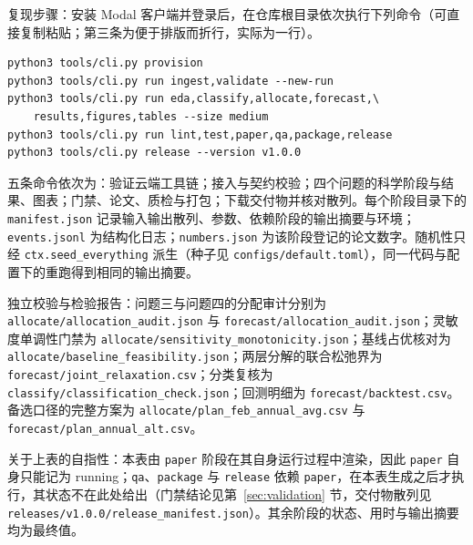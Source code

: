 复现步骤：安装 Modal 客户端并登录后，在仓库根目录依次执行下列命令（可直接复制粘贴；第三条为便于排版而折行，实际为一行）。

\begingroup\small
\begin{verbatim}
python3 tools/cli.py provision
python3 tools/cli.py run ingest,validate --new-run
python3 tools/cli.py run eda,classify,allocate,forecast,\
    results,figures,tables --size medium
python3 tools/cli.py run lint,test,paper,qa,package,release
python3 tools/cli.py release --version v1.0.0
\end{verbatim}
\endgroup

\noindent 五条命令依次为：验证云端工具链；接入与契约校验；四个问题的科学阶段与结果、图表；门禁、论文、质检与打包；下载交付物并核对散列。每个阶段目录下的 \nolinkurl{manifest.json} 记录输入输出散列、参数、依赖阶段的输出摘要与环境；\nolinkurl{events.jsonl} 为结构化日志；\nolinkurl{numbers.json} 为该阶段登记的论文数字。随机性只经 \nolinkurl{ctx.seed_everything} 派生（种子见 \nolinkurl{configs/default.toml}），同一代码与配置下的重跑得到相同的输出摘要。

独立校验与检验报告：问题三与问题四的分配审计分别为 \nolinkurl{allocate/allocation_audit.json} 与 \nolinkurl{forecast/allocation_audit.json}；灵敏度单调性门禁为 \nolinkurl{allocate/sensitivity_monotonicity.json}；基线占优核对为 \nolinkurl{allocate/baseline_feasibility.json}；两层分解的联合松弛界为 \nolinkurl{forecast/joint_relaxation.csv}；分类复核为 \nolinkurl{classify/classification_check.json}；回测明细为 \nolinkurl{forecast/backtest.csv}。备选口径的完整方案为 \nolinkurl{allocate/plan_feb_annual_avg.csv} 与 \nolinkurl{forecast/plan_annual_alt.csv}。

\noindent 关于上表的自指性：本表由 \nolinkurl{paper} 阶段在其自身运行过程中渲染，因此 \nolinkurl{paper} 自身只能记为 running；\nolinkurl{qa}、\nolinkurl{package} 与 \nolinkurl{release} 依赖 \nolinkurl{paper}，在本表生成之后才执行，其状态不在此处给出（门禁结论见第~\ref{sec:validation} 节，交付物散列见 \nolinkurl{releases/v1.0.0/release_manifest.json}）。其余阶段的状态、用时与输出摘要均为最终值。

